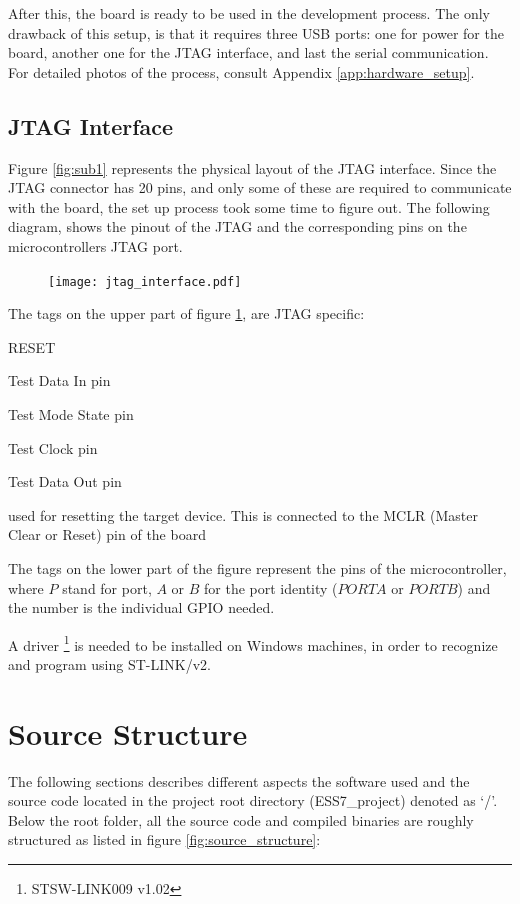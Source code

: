 After this, the board is ready to be used in the development process.
The only drawback of this setup, is that it requires three USB ports:
one for power for the board, another one for the JTAG interface, and last
the serial communication. For detailed photos of the process, consult
Appendix \ref{app:hardware_setup}.

\subsection{JTAG Interface}
\label{ssec:JTAG_Interface}
Figure \ref{fig:sub1} represents the physical layout of the JTAG interface.
Since the JTAG connector has 20 pins, and only some of these are required
to communicate with the board, the set up process took some time to figure
out. The following diagram, shows the pinout of the JTAG and the 
corresponding pins on the microcontroller\textquotesingle s JTAG port.

\begin{figure}[H]
\centering
\texttt{[image: jtag\_interface.pdf]}
\label{fig:jtag_interface}
\end{figure}

The tags on the upper part of figure \ref{fig:jtag_interface}, are
JTAG specific:
\begin{labeling}{RESET}
	\item [\textbf{TDI}]
		Test Data In pin
	\item [\textbf{TMS}]
		Test Mode State pin
	\item [\textbf{TCK}]
		Test Clock pin
	\item [\textbf{TDO}]
		Test Data Out pin
	\item [\textbf{RESET}]
		used for resetting the target device. This is connected to the 
		MCLR (Master Clear or Reset) pin of the board
\end{labeling}

The tags on the lower part of the figure represent the pins of the 
microcontroller, where $P$ stand for port, $A$ or $B$ for the port
identity ($PORTA$ or $PORTB$) and the number is the individual GPIO needed.

A driver \footnote{STSW-LINK009 v1.02} 
is needed to be installed on Windows machines, in order to
recognize and program using ST-LINK/v2.

\section{Source Structure}
The following sections describes different aspects the software used and
the source code located in the project root directory (ESS7\_project) denoted as `/'.
Below the root folder,
all the source code and compiled binaries are roughly structured as listed
in figure \ref{fig:source_structure}:

